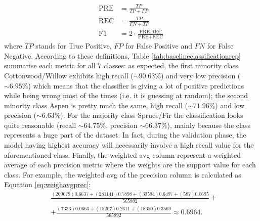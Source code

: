 \begin{equation}
\begin{aligned}
\text{PRE} &= \frac{TP}{TP+FP} \\
\text{REC} &= \frac{TP}{FN+TP} \\
\text{F1} &= 2 \cdot \frac{\text{PRE} \cdot \text{REC}}{\text{PRE} + \text{REC}}
\end{aligned}
\end{equation}
where $TP$ stands for True Positive, $FP$ for False Positive and $FN$ for False Negative. According to these definitions, Table \ref{tab:baselineclassificationrep} summarise each metric for all $7$ classes: as expected, the first minority class Cottonwood/Willow exhibits high recall ($\sim90.63\%$) and very low precision ($\sim6.95\%$) which means that the classifier is giving a lot of positive predictions while being wrong most of the times (i.e. it is guessing at random); the second minority class Aspen is pretty much the same, high recall ($\sim71.96\%$) and low precision ($\sim6.63\%$). For the majority class Spruce/Fir the classification looks quite reasonable (recall $\sim64.75\%$, precision $\sim66.37\%$), mainly because the class represents a huge part of the dataset. In fact, during the validation phase, the model having highest accuracy will necessarily involve a high recall value for the aforementioned class. Finally, the weighted avg column represent a weighted average of each precision metric where the weights are the support value for each class. For example, the weighted avg of the precision column is calculated as Equation \ref{eq:weighavgprec}:
\begin{equation}
\label{eq:weighavgprec}
\begin{aligned}
&\frac{(209679)0.6637 + (281141)0.7898 + (33594)0.6497+(587)0.0695}{565892}+ \\
&+\frac{(7333)0.0663 + (15207)0.2611 + (18350)0.3569}{565892} \approx 0.6964.
\end{aligned}
\end{equation}
